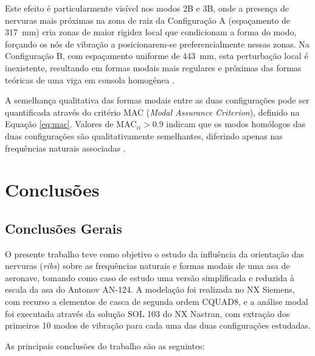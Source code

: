 \documentclass[a4paper,fleqn,noprintline]{cas-dc}
\begin{document}
Este efeito é particularmente visível nos modos 2B e 3B, onde a presença de nervuras mais próximas na zona de raiz da Configuração A (espaçamento de \SI{317}{\milli\meter}) cria zonas de maior rigidez local que condicionam a forma do modo, forçando os nós de vibração a posicionarem-se preferencialmente nessas zonas. Na Configuração B, com espaçamento uniforme de \SI{443}{\milli\meter}, esta perturbação local é inexistente, resultando em formas modais mais regulares e próximas das formas teóricas de uma viga em consola homogénea \cite{Rao2011}.

A semelhança qualitativa das formas modais entre as duas configurações pode ser quantificada através do critério MAC (\textit{Modal Assurance Criterion}), definido na Equação \eqref{eq:mac}. Valores de $\text{MAC}_{ii} > 0.9$ indicam que os modos homólogos das duas configurações são qualitativamente semelhantes, diferindo apenas nas frequências naturais associadas \cite{Allemang1982, Ewins2000}.

\section{Conclusões}
\label{chap:conclusoes}

\subsection{Conclusões Gerais}

O presente trabalho teve como objetivo o estudo da influência da orientação das nervuras (\textit{ribs}) sobre as frequências naturais e formas modais de uma asa de aeronave, tomando como caso de estudo uma versão simplificada e reduzida à escala da asa do Antonov AN-124. A modelação foi realizada no NX Siemens, com recurso a elementos de casca de segunda ordem CQUAD8, e a análise modal foi executada através da solução SOL 103 do NX Nastran, com extração dos primeiros 10 modos de vibração para cada uma das duas configurações estudadas.

As principais conclusões do trabalho são as seguintes:
\end{document}

